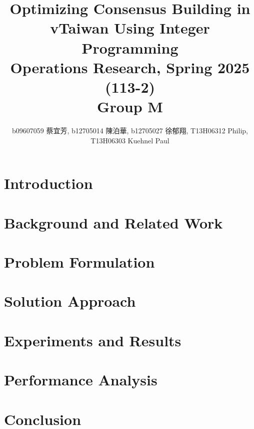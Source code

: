 \documentclass[11pt]{article}
\title{Optimizing Consensus Building in vTaiwan Using Integer Programming \\
\large Operations Research, Spring 2025 (113-2) \\ Group M}
\author{b09607059 {\chinesefont 蔡宜芳}, b12705014 {\chinesefont 陳泊華},
    b12705027 {\chinesefont 徐郁翔}, T13H06312 Philip, T13H06303 Kuehnel Paul}
\affil{Department of Information Management, National Taiwan University}
\begin{document}
\maketitle


\section{Introduction}\label{sec:intro}


\section{Background and Related Work}\label{sec:background}


\section{Problem Formulation}\label{sec:problem_formulation}


%

\section{Solution Approach}\label{sec:solution}


\section{Experiments and Results}\label{sec:experiments}


\section{Performance Analysis}\label{sec:performance}


\section{Conclusion}\label{sec:conclusion}


\printbibliography
\end{document}
